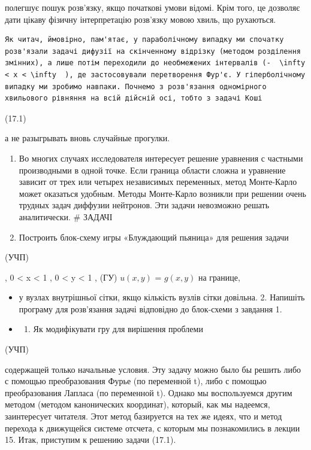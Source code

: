 \documentclass[
  ukrainian,
]{article}
\providecommand{\tightlist}{%
  \setlength{\itemsep}{0pt}\setlength{\parskip}{0pt}}
\begin{document}
полегшує пошук розв'язку, якщо початкові умови відомі. Крім того, це
дозволяє дати цікаву фізичну інтерпретацію розв'язку мовою хвиль, що
рухаються.

\begin{verbatim}
Як читач, ймовірно, пам'ятає, у параболічному випадку ми спочатку розв'язали задачі дифузії на скінченному відрізку (методом розділення змінних), а лише потім переходили до необмежених інтервалів (-  \infty < x < \infty  ), де застосовували перетворення Фур'є. У гіперболічному випадку ми зробимо навпаки. Почнемо з розв'язання одномірного хвильового рівняння на всій дійсній осі, тобто з задачі Коші
\end{verbatim}

(17.1)

а не разыгрывать вновь случайные прогулки.

\begin{enumerate}
\def\labelenumi{\arabic{enumi}.}
\setcounter{enumi}{1}
\tightlist
\item
  Во многих случаях исследователя интересует решение уравнения с
  частными производными в одной точке. Если граница области сложна и
  уравнение зависит от трех или четырех независимых переменных, метод
  Монте-Карло может оказаться удобным. Методы Монте-Карло возникли при
  решении очень трудных задач диффузии нейтронов. Эти задачи невозможно
  решать аналитически. \# ЗАДАЧІ
\item
  Построить блок-схему игры «Блуждающий пьяница» для решения задачи
\end{enumerate}

(УЧП)

, 0 \textless{} x \textless{} 1 , 0 \textless{} y \textless{} 1 , (ГУ)
\(u(x, y)\) = \(g(x, y)\) на границе,

\begin{itemize}
\item
  у вузлах внутрішньої сітки, якщо кількість вузлів сітки довільна. 2.
  Напишіть програму для розв'язання задачі відповідно до блок-схеми з
  завдання 1.
\item
  \begin{enumerate}
  \def\labelenumi{\arabic{enumi}.}
  \setcounter{enumi}{2}
  \tightlist
  \item
    Як модифікувати гру для вирішення проблеми
  \end{enumerate}
\end{itemize}

(УЧП)

содержащей только начальные условия. Эту задачу можно было бы решить
либо с помощью преобразования Фурье (по переменной t), либо с помощью
преобразования Лапласа (по переменной t). Однако мы воспользуемся другим
методом (методом канонических координат), который, как мы надеемся,
заинтересует читателя. Этот метод базируется на тех же идеях, что и
метод перехода к движущейся системе отсчета, с которым мы познакомились
в лекции 15. Итак, приступим к решению задачи (17.1).
\end{document}
